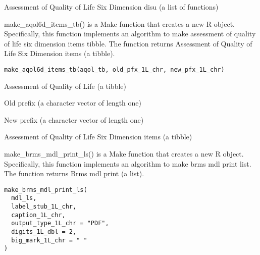 \documentclass[a4paper]{book}
\begin{document}
%
\begin{Value}
Assessment of Quality of Life Six Dimension disu (a list of functions)
\end{Value}
%
\begin{Description}\relax
make\_aqol6d\_items\_tb() is a Make function that creates a new R object. Specifically, this function implements an algorithm to make assessment of quality of life six dimension items tibble. The function returns Assessment of Quality of Life Six Dimension items (a tibble).
\end{Description}
%
\begin{Usage}
\begin{verbatim}
make_aqol6d_items_tb(aqol_tb, old_pfx_1L_chr, new_pfx_1L_chr)
\end{verbatim}
\end{Usage}
%
\begin{Arguments}
\begin{ldescription}
\item[\code{aqol\_tb}] Assessment of Quality of Life (a tibble)

\item[\code{old\_pfx\_1L\_chr}] Old prefix (a character vector of length one)

\item[\code{new\_pfx\_1L\_chr}] New prefix (a character vector of length one)
\end{ldescription}
\end{Arguments}
%
\begin{Value}
Assessment of Quality of Life Six Dimension items (a tibble)
\end{Value}
%
\begin{Description}\relax
make\_brms\_mdl\_print\_ls() is a Make function that creates a new R object. Specifically, this function implements an algorithm to make brms mdl print list. The function returns Brms mdl print (a list).
\end{Description}
%
\begin{Usage}
\begin{verbatim}
make_brms_mdl_print_ls(
  mdl_ls,
  label_stub_1L_chr,
  caption_1L_chr,
  output_type_1L_chr = "PDF",
  digits_1L_dbl = 2,
  big_mark_1L_chr = " "
)
\end{verbatim}
\end{Usage}
\end{document}
